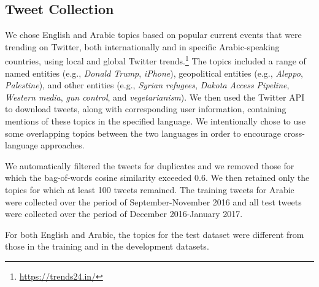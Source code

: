 \documentclass[11pt,a4paper]{article}
\begin{document}


\subsection{Tweet Collection}

We chose English and Arabic topics based on popular current events that were trending on Twitter, both internationally and in specific Arabic-speaking countries, using local and global Twitter trends.\footnote{\url{https://trends24.in/}}  The topics included a range of named entities (e.g., \emph{Donald Trump}, \emph{iPhone}), geopolitical entities (e.g., \emph{Aleppo}, \emph{Palestine}), and other entities (e.g., \emph{Syrian refugees}, \emph{Dakota Access Pipeline}, \emph{Western media}, \emph{gun control}, and \emph{vegetarianism}).  We then used the Twitter API to download tweets, along with corresponding user information, containing mentions of these topics in the specified language. We intentionally chose to use some overlapping topics between the two languages in order to encourage cross-language approaches. 


We automatically filtered the tweets for duplicates and we removed those for which the bag-of-words cosine similarity exceeded 0.6. We then retained only the topics for which at least 100 tweets remained. The training tweets for Arabic were collected over the period of September-November 2016 and all test tweets were collected over the period of December 2016-January 2017.

For both English and Arabic, 
the topics for the test dataset were different from those in the training and in the development datasets.
 
\setarab
\novocalize
\end{document}
